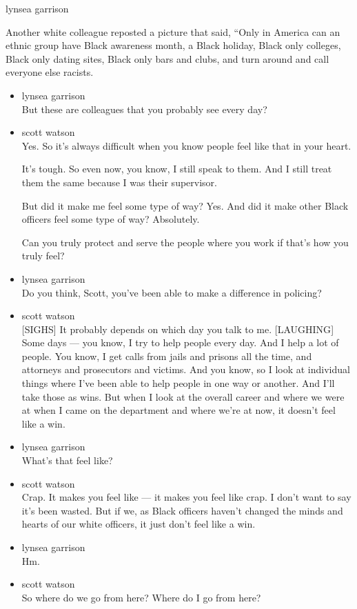 lynsea garrison

Another white colleague reposted a picture that said, ``Only in America
can an ethnic group have Black awareness month, a Black holiday, Black
only colleges, Black only dating sites, Black only bars and clubs, and
turn around and call everyone else racists.

\begin{itemize}
\item
  lynsea garrison\\
  But these are colleagues that you probably see every day?
\item
  scott watson\\
  Yes. So it's always difficult when you know people feel like that in
  your heart.

  It's tough. So even now, you know, I still speak to them. And I still
  treat them the same because I was their supervisor.

  But did it make me feel some type of way? Yes. And did it make other
  Black officers feel some type of way? Absolutely.

  Can you truly protect and serve the people where you work if that's
  how you truly feel?
\item
  lynsea garrison\\
  Do you think, Scott, you've been able to make a difference in
  policing?
\item
  scott watson\\
  {[}SIGHS{]} It probably depends on which day you talk to me.
  {[}LAUGHING{]} Some days --- you know, I try to help people every day.
  And I help a lot of people. You know, I get calls from jails and
  prisons all the time, and attorneys and prosecutors and victims. And
  you know, so I look at individual things where I've been able to help
  people in one way or another. And I'll take those as wins. But when I
  look at the overall career and where we were at when I came on the
  department and where we're at now, it doesn't feel like a win.
\item
  lynsea garrison\\
  What's that feel like?
\item
  scott watson\\
  Crap. It makes you feel like --- it makes you feel like crap. I don't
  want to say it's been wasted. But if we, as Black officers haven't
  changed the minds and hearts of our white officers, it just don't feel
  like a win.
\item
  lynsea garrison\\
  Hm.
\item
  scott watson\\
  So where do we go from here? Where do I go from here?


\end{itemize}
